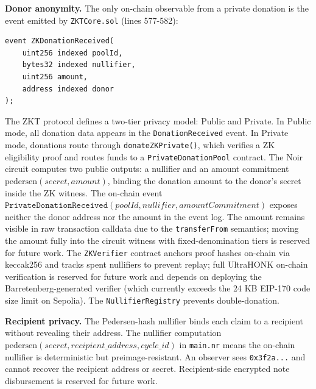 \documentclass[conference]{IEEEtran}
\begin{document}
\textbf{Donor anonymity.} The only on-chain observable from a private donation is the event emitted by \texttt{ZKTCore.sol} (lines 577-582):

\begin{verbatim}
event ZKDonationReceived(
    uint256 indexed poolId,
    bytes32 indexed nullifier,
    uint256 amount,
    address indexed donor
);
\end{verbatim}

The ZKT protocol defines a two-tier privacy model: Public and Private\cite{b_zkfi}\cite{b_zkp_financial}. In Public mode, all donation data appears in the \texttt{DonationReceived} event. In Private mode, donations route through \texttt{donateZKPrivate()}, which verifies a ZK eligibility proof and routes funds to a \texttt{PrivateDonationPool} contract\cite{b_zkp_blockchain}\cite{b_zkp_vuln}. The Noir circuit computes two public outputs: a nullifier and an amount commitment $\text{pedersen}(\mathit{secret}, \mathit{amount})$\cite{b_poseidon}\cite{b_aztec}, binding the donation amount to the donor's secret inside the ZK witness. The on-chain event $\texttt{PrivateDonationReceived}(\mathit{poolId}, \mathit{nullifier}, \mathit{amountCommitment})$ exposes neither the donor address nor the amount in the event log\cite{b_zkfi}. The amount remains visible in raw transaction calldata due to the \texttt{transferFrom} semantics; moving the amount fully into the circuit witness with fixed-denomination tiers is reserved for future work\cite{b_mixer_analysis}. The \texttt{ZKVerifier} contract anchors proof hashes on-chain via keccak256 and tracks spent nullifiers to prevent replay\cite{b_aztec}\cite{b_zkp_blockchain}; full UltraHONK on-chain verification is reserved for future work and depends on deploying the Barretenberg-generated verifier (which currently exceeds the 24 KB EIP-170 code size limit on Sepolia)\cite{b_aztec}. The \texttt{NullifierRegistry} prevents double-donation\cite{b_poseidon}\cite{b_aztec}.

\textbf{Recipient privacy.} The Pedersen-hash nullifier\cite{b_aztec}\cite{b_poseidon} binds each claim to a recipient without revealing their address. The nullifier computation $\text{pedersen}(\mathit{secret}, \mathit{recipient\_address}, \mathit{cycle\_id})$ in \texttt{main.nr} means the on-chain nullifier is deterministic but preimage-resistant\cite{b_poseidon}. An observer sees \texttt{0x3f2a...} and cannot recover the recipient address or secret\cite{b_zkp_financial}\cite{b_zkp_blockchain}. Recipient-side encrypted note disbursement is reserved for future work\cite{b_bbs_w3c}.
\end{document}
